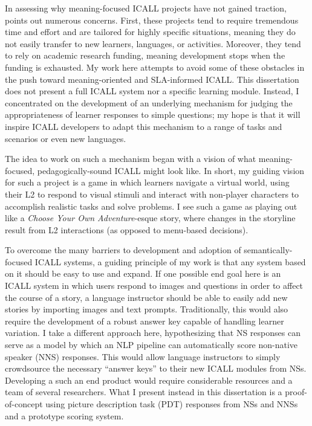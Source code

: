 In assessing why meaning-focused ICALL projects have not gained traction, \citet{schulze2010taking} points out numerous concerns. First, these projects tend to require tremendous time and effort and are tailored for highly specific situations, meaning they do not easily transfer to new learners, languages, or activities. Moreover, they tend to rely on academic research funding, meaning development stops when the funding is exhausted. My work here attempts to avoid some of these obstacles in the push toward meaning-oriented and SLA-informed ICALL. This dissertation does not present a full ICALL system nor a specific learning module. Instead, I concentrated on the development of an underlying mechanism for judging the appropriateness of learner responses to simple questions; my hope is that it will inspire ICALL developers to adapt this mechanism to a range of tasks and scenarios or even new languages.

The idea to work on such a mechanism began with a vision of what meaning-focused, pedagogically-sound ICALL might look like.
In short, my guiding vision for such a project is a game in which learners navigate a virtual world, using their L2 to respond to visual stimuli and interact with non-player characters to accomplish realistic tasks and solve problems. I see such a game as playing out like a \textit{Choose Your Own Adventure}-esque story, where changes in the storyline result from L2 interactions (as opposed to menu-based decisions).

To overcome the many barriers to development and adoption of semantically-focused ICALL systems, a guiding principle of my work is that any system based on it should be easy to use and expand. If one possible end goal here is an ICALL system
 in which users respond to images and questions in order to affect the course of a story, a language instructor should be able to easily add new stories by importing images and text prompts. Traditionally, this would also require the development of a robust answer key capable of handling learner variation. I take a different approach here, hypothesizing that NS responses can serve as a model by which an NLP pipeline can automatically score non-native speaker (NNS) responses. This would allow language instructors to simply crowdsource the necessary ``answer keys'' to their new ICALL modules from NSs. Developing a such an end product would require considerable resources and a team of several researchers. What I present instead in this dissertation is a proof-of-concept using picture description task (PDT) responses from NSs and NNSs and a prototype scoring system.


